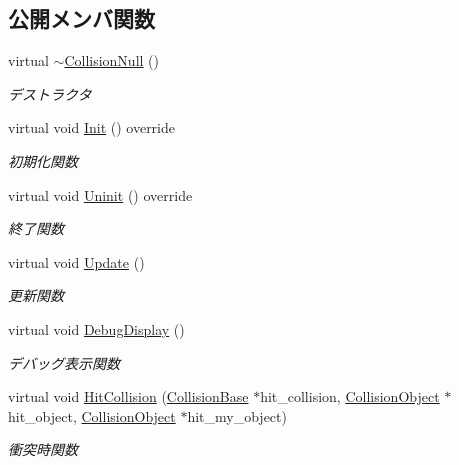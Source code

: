 \subsection*{公開メンバ関数}
\begin{DoxyCompactItemize}
\item 
virtual \mbox{\hyperlink{class_collision_null_a2eaef584b2ae2c4062df8bf3a6533fb3}{$\sim$\+Collision\+Null}} ()
\begin{DoxyCompactList}\small\item\em デストラクタ \end{DoxyCompactList}\item 
virtual void \mbox{\hyperlink{class_collision_null_af5db1d080c1c0c5a1199062850d8a2ff}{Init}} () override
\begin{DoxyCompactList}\small\item\em 初期化関数 \end{DoxyCompactList}\item 
virtual void \mbox{\hyperlink{class_collision_null_a7c6d0ec502efc55e2f406415451152f5}{Uninit}} () override
\begin{DoxyCompactList}\small\item\em 終了関数 \end{DoxyCompactList}\item 
virtual void \mbox{\hyperlink{class_collision_null_a5e5e094e3fbe3ccc0515e485c739bd15}{Update}} ()
\begin{DoxyCompactList}\small\item\em 更新関数 \end{DoxyCompactList}\item 
virtual void \mbox{\hyperlink{class_collision_null_a3ee0dacfb13c949538519f39d2f6fb0f}{Debug\+Display}} ()
\begin{DoxyCompactList}\small\item\em デバッグ表示関数 \end{DoxyCompactList}\item 
virtual void \mbox{\hyperlink{class_collision_null_a580f507d8918865679feec3cc7b613d1}{Hit\+Collision}} (\mbox{\hyperlink{class_collision_base}{Collision\+Base}} $\ast$hit\+\_\+collision, \mbox{\hyperlink{class_collision_object}{Collision\+Object}} $\ast$hit\+\_\+object, \mbox{\hyperlink{class_collision_object}{Collision\+Object}} $\ast$hit\+\_\+my\+\_\+object)
\begin{DoxyCompactList}\small\item\em 衝突時関数 \end{DoxyCompactList}\item 

\end{DoxyCompactItemize}
